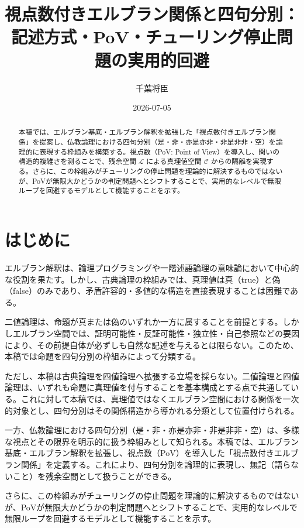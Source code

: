 \documentclass[11pt,a4paper]{article}
\title{視点数付きエルブラン関係と四句分別：\\
       記述方式・PoV・チューリング停止問題の実用的回避}
\author{千葉将臣}
\date{2026-07-05}
\newcommand{\C}{\mathcal{C}}
\newcommand{\Lspace}{\mathcal{L}}
\begin{document}
\maketitle

\begin{abstract}
本稿では、エルブラン基底・エルブラン解釈を拡張した「視点数付きエルブラン関係」を提案し、仏教論理における四句分別（是・非・亦是亦非・非是非非・空）を論理的に表現する枠組みを構築する。視点数（PoV: Point of View）を導入し、問いの構造的複雑さを測ることで、残余空間 $\Lspace$ による真理値空間 $\C$ からの隔離を実現する。さらに、この枠組みがチューリングの停止問題を理論的に解決するものではないが、PoVが無限大かどうかの判定問題へとシフトすることで、実用的なレベルで無限ループを回避するモデルとして機能することを示す。
\end{abstract}

\section{はじめに}
\label{sec:intro}

エルブラン解釈は、論理プログラミングや一階述語論理の意味論において中心的な役割を果たす。しかし、古典論理の枠組みでは、真理値は真（true）と偽（false）のみであり、矛盾許容的・多値的な構造を直接表現することは困難である。

二値論理は、命題が真または偽のいずれか一方に属することを前提とする。しかしエルブラン空間では、証明可能性・反証可能性・独立性・自己参照などの要因により、その前提自体が必ずしも自然な記述を与えるとは限らない。このため、本稿では命題を四句分別の枠組みによって分類する。

ただし、本稿は古典論理を四値論理へ拡張する立場を採らない。二値論理と四値論理は、いずれも命題に真理値を付与することを基本構成とする点で共通している。これに対して本稿では、真理値ではなくエルブラン空間における関係を一次的対象とし、四句分別はその関係構造から導かれる分類として位置付けられる。

一方、仏教論理における四句分別（是・非・亦是亦非・非是非非・空）は、多様な視点とその限界を明示的に扱う枠組みとして知られる。本稿では、エルブラン基底・エルブラン解釈を拡張し、視点数（PoV）を導入した「視点数付きエルブラン関係」を定義する。これにより、四句分別を論理的に表現し、無記（語らないこと）を残余空間として扱うことができる。

さらに、この枠組みがチューリングの停止問題を理論的に解決するものではないが、PoVが無限大かどうかの判定問題へとシフトすることで、実用的なレベルで無限ループを回避するモデルとして機能することを示す。
\end{document}
